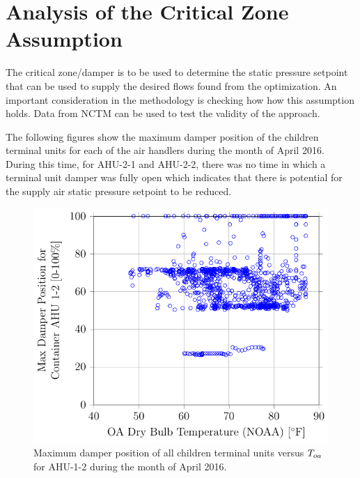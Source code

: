 \section{Analysis of the Critical Zone Assumption}

The critical zone/damper is to be used to determine the static pressure
setpoint that can be used to supply the desired flows found from the
optimization. An important consideration in the methodology is checking
how how this assumption holds. Data from NCTM can be used to test the
validity of the approach.

The following figures show the maximum damper position of the children
terminal units for each of the air handlers during the month of April
2016. During this time, for AHU-2-1 and AHU-2-2, there was no time in
which a terminal unit damper was fully open which indicates that there
is potential for the supply air static pressure setpoint to be reduced.  

\newcommand{\MaxDampCaption}[1]{Maximum damper position of all children terminal units versus \(\oat{}\) for #1 during the month of April 2016.}

\begin{figure}
\centering
\includegraphics{Plots/MaximumDamperPosition-1-2.pdf} 
\caption{\MaxDampCaption{AHU-1-2}}
\label{fig:MaxDamperPositionforContainerAHU12vsOADryBulbTemperatureNOAA}
\end{figure}

